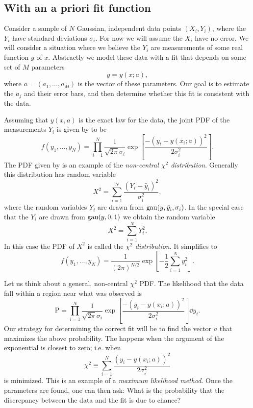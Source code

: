 \subsection{With an a priori fit function}\label{sec:fitchi2}

Consider a sample of $N$ Gaussian, independent data points $(X_i,Y_i)$,
where the $Y_i$ have standard deviations $\sigma_i$. For now we will
assume the $X_i$ have no error. We will consider a situation where
we believe the $Y_i$ are measurements of some real function $y$ of $x$.
Abstractly we model these data with a fit that depends on some set
of $M$ parameters
\begin{equation}
  y=y(x;a),
\end{equation}
where $a=(a_1,...,a_M)$ is the vector of these parameters. Our goal
is to estimate the $a_j$ and their error bars, and then determine whether
this fit is consistent with the data.

Assuming that $y(x,a)$ is the exact law for the data, the joint PDF
of the measurements $Y_i$ is given by  to be
\begin{equation}\label{eq:chi2NC}
  f(y_1,...,y_N)=\prod_{i=1}^N\frac{1}{\sqrt{2\pi}\sigma_i}
      \exp\left[\frac{-(y_i-y(x_i;a))^2}{2\sigma_i^2}\right].
\end{equation}
The PDF given by  is an example of the 
{\it non-central $\chi^2$ distribution}. Generally this distribution
has random variable
\begin{equation}
  X^2=\sum_{i=1}^N\frac{(Y_i-\hat{y}_i)^2}{\sigma_i^2},
\end{equation}
where the random variables $Y_i$ are drawn from $\operatorname{gau}(y,\hat{y}_i,\sigma_i)$. 
In the special case that the $Y_i$ are drawn from $\operatorname{gau}(y,0,1)$ we
obtain the random variable
\begin{equation}
  X^2=\sum\limits_{i=1}^NY_i^2.
\end{equation}
In this case the PDF of $X^2$ is called the {\it $\chi^2$ distribution}. 
 It simplifies to 
\begin{equation}\label{eq:chi2dist}
  f(y_1,...,y_N)=\frac{1}{(2\pi)^{N/2}}
      \exp\left[-\frac{1}{2}\sum_{i=1}^Ny_i^2\right].
\end{equation}

Let us think about a general, non-central $\chi^2$ PDF. The likelihood that the
data fall within a region near what was observed is 
\begin{equation}
  \text{P}=\prod_{i=1}^N\frac{1}{\sqrt{2\pi}\sigma_i}
      \exp\left[\frac{-(y_i-y(x_i;a))^2}{2\sigma_i^2}\right]\dd{y_i}.
\end{equation}
Our strategy for determining the correct fit will be to find the vector $a$
that maximizes the above probability. The happens when the argument
of the exponential is closest to zero; i.e. when
\begin{equation}
  \chi^2\equiv\sum_{i=1}^N\frac{(y_i-y(x_i;a))^2}{2\sigma_i^2}
\end{equation}
is minimized. This is an example of a {\it maximum likelihood method}.
Once the parameters are found, one can then ask: What is the probability
that the discrepancy between the data and the fit is due to chance? 

